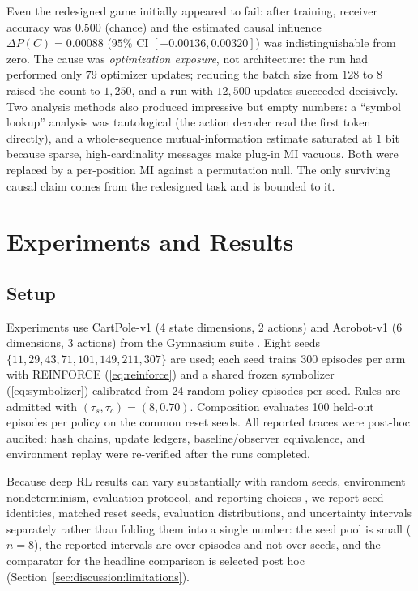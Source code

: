 \documentclass[11pt]{article}
\begin{document}
Even the redesigned game initially appeared to fail: after training, receiver accuracy was $0.500$
(chance) and the estimated causal influence $\Delta P(C)=0.00088$ ($95\%$ CI $[-0.00136,0.00320]$) was
indistinguishable from zero. The cause was \emph{optimization exposure}, not architecture: the run had
performed only $79$ optimizer updates; reducing the batch size from $128$ to $8$ raised the count to
$1{,}250$, and a run with $12{,}500$ updates succeeded decisively. Two analysis methods also produced
impressive but empty numbers: a ``symbol lookup'' analysis was tautological (the action decoder read
the first token directly), and a whole-sequence mutual-information estimate saturated at $1$ bit
because sparse, high-cardinality messages make plug-in MI vacuous. Both were replaced by a per-position
MI against a permutation null. The only surviving causal claim comes from the redesigned task and is
bounded to it.

\section{Experiments and Results}
\label{sec:experiments}

\subsection{Setup}
\label{sec:experiments:setup}

Experiments use CartPole-v1 (4 state dimensions, 2 actions) and Acrobot-v1 (6 dimensions, 3
actions) from the Gymnasium suite \cite{towers2024gymnasium}. Eight seeds
$\{11,29,43,71,101,149,211,307\}$ are used; each seed trains 300 episodes per arm with REINFORCE
(\ref{eq:reinforce}) and a shared frozen symbolizer (\ref{eq:symbolizer}) calibrated from 24
random-policy episodes per seed. Rules are admitted with $(\tau_s,\tau_c)=(8,0.70)$. Composition
evaluates 100 held-out episodes per policy on the common reset seeds. All reported traces were
post-hoc audited: hash chains, update ledgers, baseline/observer equivalence, and environment
replay were re-verified after the runs completed.

Because deep RL results can vary substantially with random seeds, environment nondeterminism,
evaluation protocol, and reporting choices \cite{henderson2018deep}, we report seed identities,
matched reset seeds, evaluation distributions, and uncertainty intervals separately rather than
folding them into a single number: the seed pool is small ($n=8$), the reported intervals are over
episodes and not over seeds, and the comparator for the headline comparison is selected post hoc
(Section~\ref{sec:discussion:limitations}).
\end{document}
